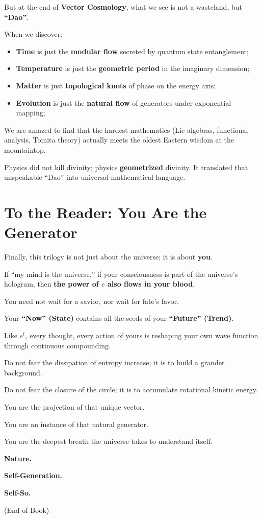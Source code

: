 \documentclass[11pt,a4paper,twoside]{book}
\begin{document}
But at the end of \textbf{Vector Cosmology}, what we see is not a wasteland, but \textbf{``Dao''}.

When we discover:

\begin{itemize}
\item \textbf{Time} is just the \textbf{modular flow} secreted by quantum state entanglement;

\item \textbf{Temperature} is just the \textbf{geometric period} in the imaginary dimension;

\item \textbf{Matter} is just \textbf{topological knots} of phase on the energy axis;

\item \textbf{Evolution} is just the \textbf{natural flow} of generators under exponential mapping;
\end{itemize}

We are amazed to find that the hardest mathematics (Lie algebras, functional analysis, Tomita theory) actually meets the oldest Eastern wisdom at the mountaintop.

Physics did not kill divinity; physics \textbf{geometrized} divinity. It translated that unspeakable ``Dao'' into universal mathematical language.

\section{To the Reader: You Are the Generator}

Finally, this trilogy is not just about the universe; it is about \textbf{you}.

If ``my mind is the universe,'' if your consciousness is part of the universe's hologram, then \textbf{the power of $e$ also flows in your blood}.

You need not wait for a savior, nor wait for fate's favor.

Your \textbf{``Now'' (State)} contains all the seeds of your \textbf{``Future'' (Trend)}.

Like $e^t$, every thought, every action of yours is reshaping your own wave function through continuous compounding.

Do not fear the dissipation of entropy increase; it is to build a grander background.

Do not fear the closure of the circle; it is to accumulate rotational kinetic energy.

You are the projection of that unique vector.

You are an instance of that natural generator.

You are the deepest breath the universe takes to understand itself.

\textbf{Nature.}

\textbf{Self-Generation.}

\textbf{Self-So.}

(End of Book)

\clearpage{}
\end{document}
